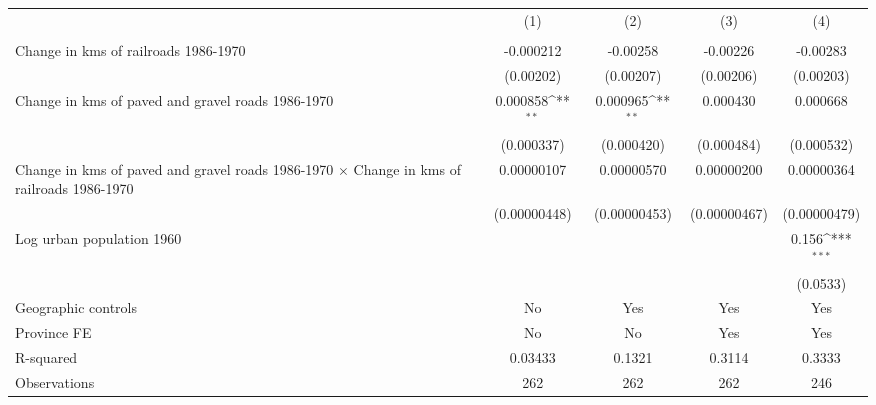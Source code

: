 {
\def\sym#1{\ifmmode^{#1}\else\(^{#1}\)\fi}
\begin{tabular}{l*{4}{c}}
\hline\hline
                &\multicolumn{1}{c}{(1)}&\multicolumn{1}{c}{(2)}&\multicolumn{1}{c}{(3)}&\multicolumn{1}{c}{(4)}\\
                &\multicolumn{1}{c}{}&\multicolumn{1}{c}{}&\multicolumn{1}{c}{}&\multicolumn{1}{c}{}\\
\hline
Change in kms of railroads 1986-1970&-0.000212         & -0.00258         & -0.00226         & -0.00283         \\
                &(0.00202)         &(0.00207)         &(0.00206)         &(0.00203)         \\
[1em]
Change in kms of paved and gravel roads 1986-1970& 0.000858\sym{**} & 0.000965\sym{**} & 0.000430         & 0.000668         \\
                &(0.000337)         &(0.000420)         &(0.000484)         &(0.000532)         \\
[1em]
Change in kms of paved and gravel roads 1986-1970 $\times$ Change in kms of railroads 1986-1970&0.00000107         &0.00000570         &0.00000200         &0.00000364         \\
                &(0.00000448)         &(0.00000453)         &(0.00000467)         &(0.00000479)         \\
[1em]
Log urban population 1960&                  &                  &                  &    0.156\sym{***}\\
                &                  &                  &                  & (0.0533)         \\
\hline
Geographic controls&       No         &      Yes         &      Yes         &      Yes         \\
Province FE     &       No         &       No         &      Yes         &      Yes         \\
R-squared       &  0.03433         &   0.1321         &   0.3114         &   0.3333         \\
Observations    &      262         &      262         &      262         &      246         \\
\hline\hline
\end{tabular}
}
